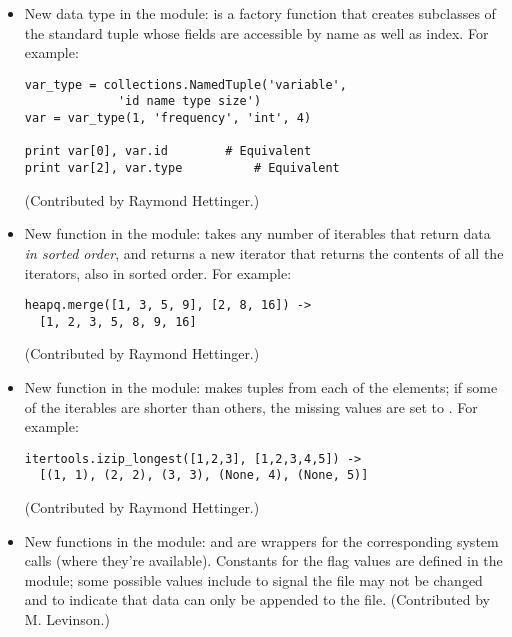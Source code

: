 \documentclass{howto}
\begin{document}
\begin{itemize}

\item New data type in the  module:
 is a factory function that
creates subclasses of the standard tuple whose fields are accessible
by name as well as index.  For example:

\begin{verbatim}
var_type = collections.NamedTuple('variable', 
             'id name type size')
var = var_type(1, 'frequency', 'int', 4)

print var[0], var.id		# Equivalent
print var[2], var.type          # Equivalent
\end{verbatim}

(Contributed by Raymond Hettinger.)

\item New function in the  module:
takes any number of iterables that return data 
\emph{in sorted order}, 
and 
returns a new iterator that returns the contents of
all the iterators, also in sorted order.  For example:

\begin{verbatim}
heapq.merge([1, 3, 5, 9], [2, 8, 16]) ->
  [1, 2, 3, 5, 8, 9, 16]
\end{verbatim}

(Contributed by Raymond Hettinger.)

\item New function in the  module:
makes tuples from each of the elements; if some of the iterables
are shorter than others, the missing values 
are set to .  For example:

\begin{verbatim}
itertools.izip_longest([1,2,3], [1,2,3,4,5]) ->
  [(1, 1), (2, 2), (3, 3), (None, 4), (None, 5)]
\end{verbatim}

(Contributed by Raymond Hettinger.)

\item New functions in the  module: 
and  are wrappers for the corresponding system
calls (where they're available).  Constants for the flag values are
defined in the  module; some possible values include
 to signal the file may not be changed and
 to indicate that data can only be appended to the
file.  (Contributed by M. Levinson.)


\end{itemize}
\end{document}
